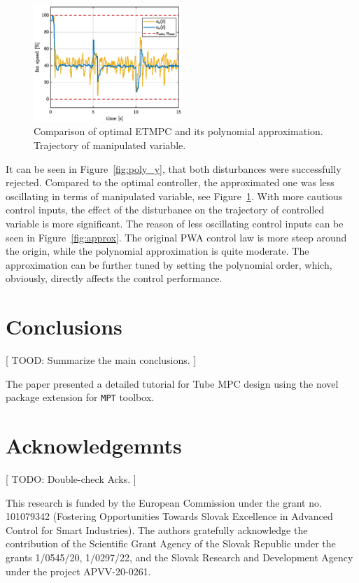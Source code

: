 \documentclass[letterpaper, 10 pt, conference]{ieeeconf}
\begin{document}
\begin{figure}
	\begin{center}
		\includegraphics[width=0.5\textwidth]{images/poly_v.eps}
		\caption{Comparison of optimal ETMPC and its polynomial approximation. Trajectory of manipulated variable.}
		\label{fig:poly_u}
	\end{center}
\end{figure}

It can be seen in Figure~\ref{fig:poly_y}, that both disturbances were successfully rejected. Compared to the optimal controller, the approximated one was less oscillating in terms of manipulated variable, see Figure~\ref{fig:poly_u}. With more cautious control inputs, the effect of the disturbance on the trajectory of controlled variable is more significant. The reason of less oscillating control inputs can be seen in Figure~\ref{fig:approx}. The original PWA control law is more steep around the origin, while the polynomial approximation is quite moderate. The approximation can be further tuned by setting the polynomial order, which, obviously, directly affects the control performance.


\section{Conclusions}
\label{sec:conclusions}

[ TOOD: Summarize the main conclusions. ]

The paper presented a detailed tutorial for Tube MPC design using the novel package extension for \texttt{MPT} toolbox. 

\addtolength{\textheight}{-12cm}

\section*{Acknowledgemnts}

[ TODO: Double-check Acks. ]

This research is funded by the European Commission under the grant no. 101079342 (Fostering Opportunities Towards Slovak Excellence in Advanced Control for Smart Industries). The authors gratefully acknowledge the contribution of the Scientific Grant Agency of the Slovak Republic under the grants 1/0545/20, 1/0297/22, and the Slovak Research and Development Agency under the project APVV-20-0261. 




\end{document}
